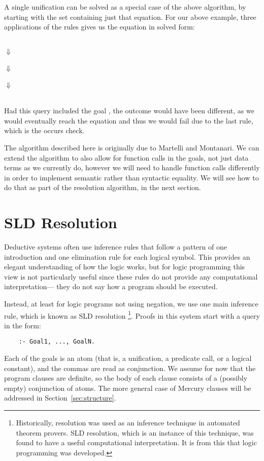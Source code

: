 A single unification can be solved
as a special case of the above algorithm,
by starting with the set containing just that equation.
For our above example,
three applications of the rules gives us
the equation in solved form:
\begin{center}
 \\
$\Downarrow$ \\
 \\
$\Downarrow$ \\
 \\
$\Downarrow$ \\
 \\[1.5em]
\end{center}
Had this query included the goal ,
the outcome would have been different,
as we would eventually reach the equation 
and thus we would fail due to the last rule,
which is the occurs check.

The algorithm described here
is originally due to Martelli and Montanari.
We can extend the algorithm
to also allow for function calls in the goals,
not just data terms as we currently do,
however we will need to handle function calls differently
in order to implement
semantic rather than syntactic equality.
We will see how to do that as part of the resolution algorithm,
in the next section.


\section{SLD Resolution}
\label{sec:resolution}

Deductive systems often use
inference rules that follow a pattern of
one introduction and one elimination rule
for each logical symbol.
This provides an elegant understanding of how the logic works,
but for logic programming this view is not particularly useful
since these rules do not provide any computational interpretation---%
they do not say how a program should be executed.

Instead, at least for logic programs not using negation,
we use one main inference rule,
which is known as SLD resolution\label{gi:resolution}%
\footnote{
Historically,
resolution was used as an inference technique
in automated theorem provers.
SLD resolution, which is an instance of this technique,
was found to have a useful computational interpretation.
It is from this that logic programming was developed.
}.
Proofs in this system start with a query in the form:
\begin{verbatim}
    :- Goal1, ..., GoalN.
\end{verbatim}
Each of the goals is an atom
(that is, a unification, a predicate call, or a logical constant),
and the commas are read as conjunction.
We assume for now that the program clauses are definite,
so the body of each clause
consists of a (possibly empty) conjunction of atoms.
The more general case of Mercury clauses
will be addressed in Section~\ref{sec:structure}.

